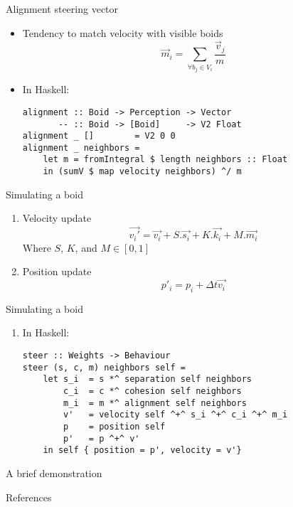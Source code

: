 \documentclass{beamer}
\begin{document}
\begin{frame}[fragile]
    \huge{Alignment steering vector}\normalsize
    \begin{itemize}
    \item Tendency to match velocity with visible boids
    \begin{equation*}
    \vec{m}_i = \sum\limits_{\forall b_j \in V_i} \frac{\vec{v}_j}{m}
    \end{equation*}
    \item<2-> In Haskell:
    \begin{verbatim}
alignment :: Boid -> Perception -> Vector
       -- :: Boid -> [Boid]     -> V2 Float
alignment _ []        = V2 0 0
alignment _ neighbors =
    let m = fromIntegral $ length neighbors :: Float
    in (sumV $ map velocity neighbors) ^/ m
    \end{verbatim}
    \end{itemize}
\end{frame}


\begin{frame}[fragile]
    \huge{Simulating a boid}\normalsize
    \begin{enumerate}
    \item<1-> Velocity update
    \begin{equation*}
    \vec{v_i\prime} = \vec{v_i} + S.\vec{s_i} + K.\vec{k_i} + M.\vec{m_i}
    \end{equation*}
        Where $S$, $K$, and $M \in [0,1]$
    \item<2-> Position update
    \begin{equation*}
    p\prime_i = p_i + \Delta t\vec{v_i}
    \end{equation*}
    \end{enumerate}
\end{frame}

\begin{frame}[fragile]
    \huge{Simulating a boid}\normalsize
    \begin{enumerate}
    \item In Haskell:
        \begin{verbatim}
steer :: Weights -> Behaviour
steer (s, c, m) neighbors self =
    let s_i  = s *^ separation self neighbors
        c_i  = c *^ cohesion self neighbors
        m_i  = m *^ alignment self neighbors
        v'   = velocity self ^+^ s_i ^+^ c_i ^+^ m_i
        p    = position self
        p'   = p ^+^ v'
    in self { position = p', velocity = v'}
        \end{verbatim}
    \end{enumerate}
\end{frame}

\begin{frame}
    \huge{A brief demonstration}\normalsize
\end{frame}

\begin{frame}
\huge{References}\normalsize
 
 
\end{frame}
\end{document}
